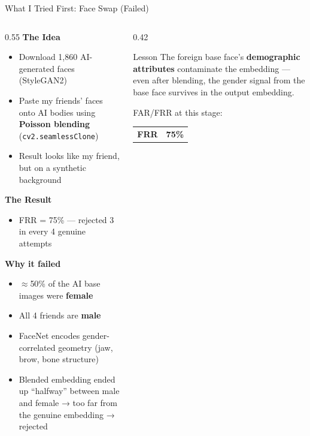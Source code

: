 \documentclass[aspectratio=169]{beamer}
\begin{document}
\begin{frame}{What I Tried First: Face Swap (Failed)}

\begin{columns}[T]
\begin{column}{0.55\textwidth}
    \textbf{The Idea}
    \begin{itemize}
        \item Download 1,860 AI-generated faces (StyleGAN2)
        \item Paste my friends' faces onto AI bodies using \textbf{Poisson blending} (\texttt{cv2.seamlessClone})
        \item Result looks like my friend, but on a synthetic background
    \end{itemize}
    \vspace{8pt}
    \textbf{The Result}
    \begin{itemize}
        \item[\alert{✗}] \alert{FRR = 75\%} — rejected 3 in every 4 genuine attempts
    \end{itemize}
    \vspace{8pt}
    \textbf{Why it failed}
    \begin{itemize}
        \item $\approx$50\% of the AI base images were \textbf{female}
        \item All 4 friends are \textbf{male}
        \item FaceNet encodes gender-correlated geometry (jaw, brow, bone structure)
        \item Blended embedding ended up ``halfway'' between male and female → too far from the genuine embedding → rejected
    \end{itemize}
\end{column}
\begin{column}{0.42\textwidth}
    \begin{alertblock}{Lesson}
        The foreign base face's \textbf{demographic attributes} contaminate the embedding — even after blending, the gender signal from the base face survives in the output embedding.
    \end{alertblock}
    \vspace{10pt}
    \begin{center}
    \Large\alert{FAR/FRR at this stage:}\\[4pt]
    \begin{tabular}{cc}
    \textbf{FRR} & \textbf{75\%} \\
    \end{tabular}
    \end{center}
\end{column}
\end{columns}
\end{frame}
\end{document}
